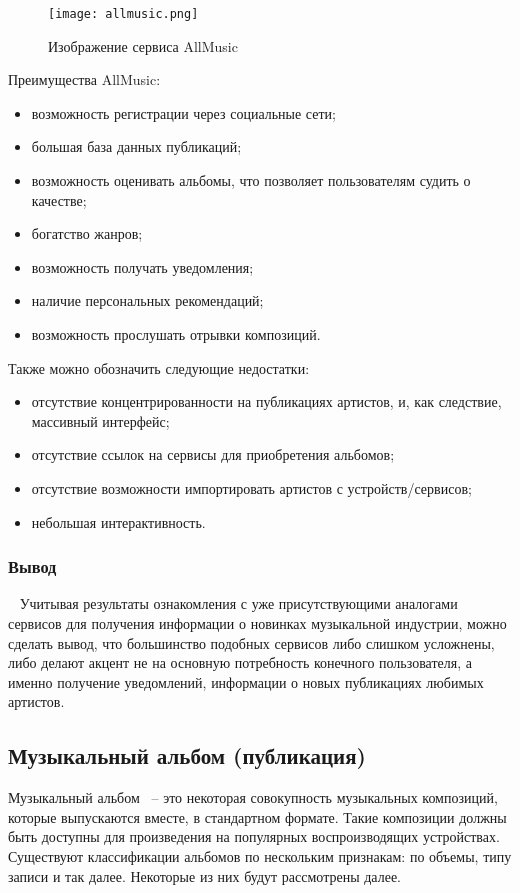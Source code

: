 \begin{figure}[ht]
\centering
  \texttt{[image: allmusic.png]}
  \caption{ Изображение сервиса AllMusic }
  \label{fig:domain:allmusic:picture}
\end{figure}

Преимущества AllMusic:

\begin{itemize}
  \item возможность регистрации через социальные сети;
  \item большая база данных публикаций;
  \item возможность оценивать альбомы, что позволяет пользователям судить о качестве;
  \item богатство жанров;
  \item возможность получать уведомления;
  \item наличие персональных рекомендаций;
  \item возможность прослушать отрывки композиций.
\end{itemize}

Также можно обозначить следующие недостатки:

\begin{itemize}
  \item отсутствие концентрированности на публикациях артистов, и, как следствие, массивный интерфейс;
  \item отсутствие ссылок на сервисы для приобретения альбомов;
  \item отсутствие возможности импортировать артистов с устройств/сервисов;
  \item небольшая интерактивность.
\end{itemize}

\subsubsection{Вывод}
~\label{sub:domain:analogues_review:conclusion}
\newline
\indent Учитывая результаты ознакомления с уже присутствующими аналогами сервисов для получения информации о новинках музыкальной индустрии, можно сделать вывод, что большинство подобных сервисов либо слишком усложнены, либо делают акцент не на основную потребность конечного пользователя, а именно получение уведомлений, информации о новых публикациях любимых артистов.

\subsection{Музыкальный альбом (публикация)}
\label{sub:domain:music_album}
Музыкальный альбом~\cite{release_doc} -- это некоторая совокупность музыкальных композиций, которые выпускаются вместе, в стандартном формате. Такие композиции должны быть доступны для произведения на популярных воспроизводящих устройствах.
Существуют классификации альбомов по нескольким признакам: по объемы, типу записи и так далее. Некоторые из них будут рассмотрены далее.

